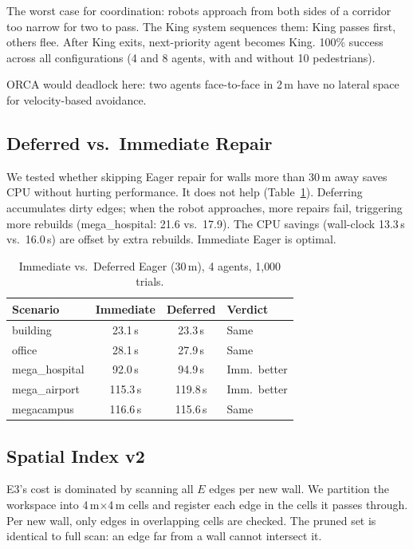 \documentclass[letterpaper, 10pt, conference]{IEEEtran}
\begin{document}
The worst case for coordination: robots approach from both sides of a corridor too narrow for two to pass. The King system sequences them: King passes first, others flee. After King exits, next-priority agent becomes King. 100\% success across all configurations (4 and 8 agents, with and without 10 pedestrians).

ORCA would deadlock here: two agents face-to-face in 2\,m have no lateral space for velocity-based avoidance.

\subsection{Deferred vs.\ Immediate Repair}

We tested whether skipping Eager repair for walls more than 30\,m away saves CPU without hurting performance. It does not help (Table~\ref{tab:deferred}). Deferring accumulates dirty edges; when the robot approaches, more repairs fail, triggering more rebuilds (mega\_hospital: 21.6 vs.\ 17.9). The CPU savings (wall-clock 13.3\,s vs.\ 16.0\,s) are offset by extra rebuilds. Immediate Eager is optimal.

\begin{table}[t]
\centering
\caption{Immediate vs.\ Deferred Eager (30\,m), 4 agents, 1{,}000 trials.}
\label{tab:deferred}
\begin{tabular}{lccl}
\toprule
Scenario & Immediate & Deferred & Verdict \\
\midrule
building       & 23.1\,s & 23.3\,s & Same \\
office         & 28.1\,s & 27.9\,s & Same \\
mega\_hospital & 92.0\,s & 94.9\,s & Imm.\ better \\
mega\_airport  & 115.3\,s & 119.8\,s & Imm.\ better \\
megacampus     & 116.6\,s & 115.6\,s & Same \\
\bottomrule
\end{tabular}
\end{table}

\subsection{Spatial Index v2}
\label{sec:spatial}

E3's cost is dominated by scanning all $E$ edges per new wall. We partition the workspace into 4\,m${\times}$4\,m cells and register each edge in the cells it passes through. Per new wall, only edges in overlapping cells are checked. The pruned set is identical to full scan: an edge far from a wall cannot intersect it.
\end{document}
